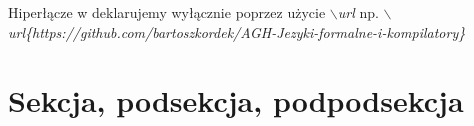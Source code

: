 Hiperłącze w deklarujemy wyłącznie poprzez użycie \textit{$\backslash$url} np. \textit{$\backslash$url\{https://github.com/bartoszkordek/AGH-Jezyki-formalne-i-kompilatory\}}

\section{Sekcja, podsekcja, podpodsekcja}


